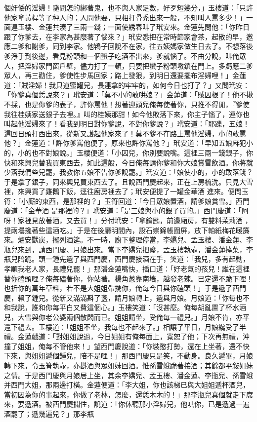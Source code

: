 \begin{showcontents}{}
個奸倭的淫婦！隨問怎的綁著鬼，也不與人家足數，好歹短幾分，」玉樓道：「只許他家拿黃桿等子秤人的；人問他要，只相打骨禿出來一般，不知叫人罵多少！」一面連玉樓、金蓮共湊了三兩一錢；一面使綉春叫了玳安來。金蓮先問他：「你昨日跟了你爹去，在李家為甚麼著了惱來？」玳安悉把在常時節家會茶，起散的早，邀應二爹和謝爹，同到李家。他鴇子回說不在家，往五姨媽家做生日去了。不想落後爹淨手到後邊，看見粉頭和一個蠻子吃酒不出來，爹就惱了。不由分說，叫俺眾人，把淫婦家門窗戶壁，儘力打了一頓，只要把蠻子粉頭墩鎖在門上。多虧應二爹眾人，再三勸住，爹使性步馬回家；路上發狠，到明日還要擺布淫婦哩！」金蓮道：「賊淫婦！我只道蜜罐兒，長連拿的牢牢的，如何今日也打了？」又問玳安：「你爹真個恁說來？」玳安道：「莫不小的敢哄娘？」金蓮道：「賊囚根子！他不揪不採，也是你爹的表子，許你罵他！想著迎頭兒俺每使著你，只推不得閒，『爹使我往桂姨家送銀子去哩。』叫的桂姨那甜！如今他敗落下來，你主子惱了，連你也叫起他淫婦來了！看我到明日對你爹說，不對你爹說？」玳安道：「耶躒，五娘！這回日頭打西出來，從新又護起他家來了！莫不爹不在路上罵他淫婦，小的敢罵他？」金蓮道：「許你爹罵他便了，原來也許你罵他？」玳安道：「早知五娘麻犯小的，小的也不對娘說。」玉樓便道：「小囚兒，你別要說嘴。這裡三兩一錢銀子，你快和來興兒替我買東西去，如此這般，今日俺每請你爹和你大娘賞雪飲酒。你將就少落我們些兒罷，我教你五娘不告你爹說罷。」玳安道：「娘使小的，小的敢落錢？于是拿了銀子，同來興兒買東西去了。且說西門慶起來，正在上房梳洗。只見大雪裡，來興買了雞鵝下飯，逕往廚房裡去了；玳安便提了一罐金華酒 進來。便問玉筲：「小廝的東西，是那裡的？」玉筲回道：「今日眾娘置酒，請爹娘賞雪。」西門慶道：「金華酒 是那裡的？」玳安道：「是三娘與小的銀子買的。」西門慶道：「阿呀！家裡見放著酒，又去買！」分付玳安：「拿鑰匙，前邊廂房，有雙料茉莉酒 ，提兩壜攙著些這酒吃。」于是在後廳明間內，設石崇錦帳圍屏，放下軸紙梅花暖簾來。爐安獸炭，擺列酒筵。不一時，廚下整理停當，李嬌兒、孟玉樓、潘金蓮、李瓶兒來到，請西門慶、月娘出來。當下李嬌兒把盞，孟玉樓執壺，潘金蓮捧菜，李瓶兒陪跪。頭一鍾先遞了與西門慶，西門慶接酒在手，笑道：「我兒，多有起動，孝順我老人家，長禮兒罷！」那潘金蓮嘴快，插口道：「好老氣的孩兒！誰在這裡替你磕頭哩？俺每磕著你，你站著。楊角葱靠南墻，越發老辣。已定還不跪下哩！也折你的萬年草料，若不是大姐姐帶携你，俺每今日與你磕頭！」于是遞了西門慶，賴了鍾兒。從新又滿滿斟了盞，請月娘轉上，遞與月娘。月娘道：「你每也不和我說，誰和你每平白又費這個心。」玉樓笑道：「沒甚麼。俺每胡亂置了杯水酒兒，大雪與你老公婆兩個散悶而已。姐姐請坐，受俺每一禮兒。」月娘不肯，亦平還下禮去。玉樓道：「姐姐不坐，我每也不起來了。」相讓了平日，月娘纔受了半禮。金蓮戲道：「對姐姐說過，今日姐姐有俺每面上，寬恕了他；下次再無禮，沖撞了姐姐，俺每不管他來！」望西門慶說道：「你裝憨打勢，還在上坐著，還不快下來，與姐姐遞個鍾兒，陪不是哩！」那西門慶只是笑，不動身。良久遞畢，月娘轉下來，令玉筲執壺，亦斟酒與眾姐妹回酒。惟孫雪蛾跪著接酒；其餘都平敍姐妹之情。于是西門慶與月娘居上坐，其余李嬌兒、孟玉樓、潘金蓮、李瓶兒、孫雪蛾并西門大姐，那兩邊打橫。金蓮便道：「李大姐，你也該梯已與大姐姐遞杯酒兒，當初因為你的事起來，你做了老林，怎麼，還恁木木的！」那李瓶兒真個就走下席來，要遞酒。被西門慶攔住，說道：「你休聽那小淫婦兒，他哄你，已是遞過一遍酒罷了；遞幾遍兒？」那李瓶
\end{showcontents}
